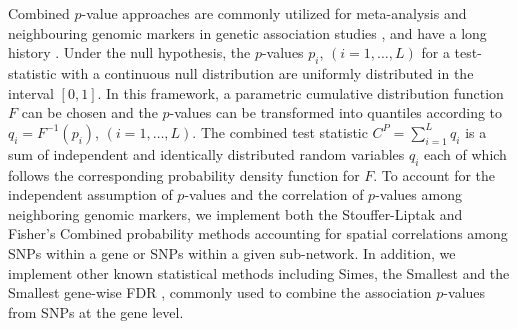\documentclass[10pt]{article}
\begin{document}
Combined $p$-value approaches are commonly utilized for meta-analysis \cite{buhm,rita} and neighbouring genomic markers in genetic association studies \cite{Zayk,jia,peng}, and have a long history \cite{folk,hedge,loughi}. Under the null hypothesis, the $p$-values $p_{i}$, $\left( i = 1,\ldots,L\right)$ for a test-statistic with a continuous null distribution are uniformly distributed in the interval 	$\left[0,1\right]$. In this framework, a parametric cumulative distribution function $F$ can be chosen and the $p$-values can be transformed into quantiles according to $q_{i} = F^{-1}(p_{i})$, $\left( i = 1,\ldots,L\right)$. The combined test statistic $C^{P} = \sum^{L}_{i=1} q_{i}$ is a sum of independent and identically distributed random variables $q_{i}$ each of which follows the corresponding probability density function for $F$. To account for the independent assumption of $p$-values and the correlation of $p$-values among neighboring genomic markers, we implement both the Stouffer-Liptak \cite{lipt} and Fisher's Combined probability \cite{fish,hess} methods accounting for spatial correlations among SNPs within a gene or SNPs within a given sub-network. In addition, we implement other known statistical methods including Simes, the Smallest and the Smallest gene-wise FDR \cite{jia,peng}, commonly used to combine the association $p$-values from SNPs at the gene level.
\end{document}
